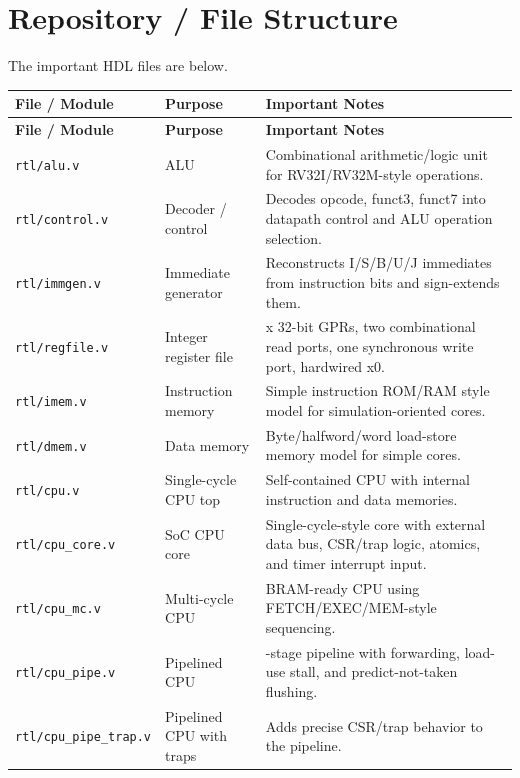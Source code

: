 \section{Repository / File Structure}

The important HDL files are below.

\begin{longtable}{|>{\RaggedRight\arraybackslash}p{}|>{\RaggedRight\arraybackslash}p{}|>{\RaggedRight\arraybackslash}p{}|}
\hline
\textbf{File / Module} & \textbf{Purpose} & \textbf{Important Notes} \\
\hline
\endfirsthead
\hline
\textbf{File / Module} & \textbf{Purpose} & \textbf{Important Notes} \\
\hline
\endhead
\texttt{rtl/alu.v} & ALU & Combinational arithmetic/logic unit for RV32I/RV32M-style operations. \\
\hline
\texttt{rtl/control.v} & Decoder / control & Decodes opcode, funct3, funct7 into datapath control and ALU operation selection. \\
\hline
\texttt{rtl/immgen.v} & Immediate generator & Reconstructs I/S/B/U/J immediates from instruction bits and sign-extends them. \\
\hline
\texttt{rtl/regfile.v} & Integer register file & 32 x 32-bit GPRs, two combinational read ports, one synchronous write port, hardwired x0. \\
\hline
\texttt{rtl/imem.v} & Instruction memory & Simple instruction ROM/RAM style model for simulation-oriented cores. \\
\hline
\texttt{rtl/dmem.v} & Data memory & Byte/halfword/word load-store memory model for simple cores. \\
\hline
\texttt{rtl/cpu.v} & Single-cycle CPU top & Self-contained CPU with internal instruction and data memories. \\
\hline
\texttt{rtl/cpu\_core.v} & SoC CPU core & Single-cycle-style core with external data bus, CSR/trap logic, atomics, and timer interrupt input. \\
\hline
\texttt{rtl/cpu\_mc.v} & Multi-cycle CPU & BRAM-ready CPU using FETCH/EXEC/MEM-style sequencing. \\
\hline
\texttt{rtl/cpu\_pipe.v} & Pipelined CPU & 5-stage pipeline with forwarding, load-use stall, and predict-not-taken flushing. \\
\hline
\texttt{rtl/cpu\_pipe\_trap.v} & Pipelined CPU with traps & Adds precise CSR/trap behavior to the pipeline. \\

\end{longtable}
